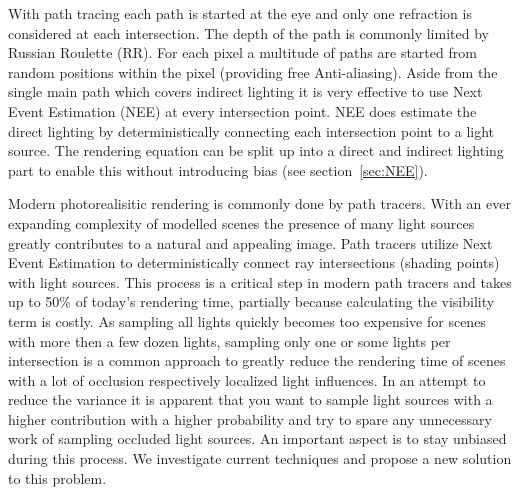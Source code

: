 With path tracing each path is started at the eye and only one refraction is considered at each intersection. The depth of the path is commonly limited by Russian Roulette (RR). For each pixel a multitude of paths are started from random positions within the pixel (providing free Anti-aliasing). Aside from the single main path which covers indirect lighting it is very effective to use Next Event Estimation (NEE) at every intersection point. NEE does estimate the direct lighting by deterministically connecting each intersection point to a light source. The rendering equation can be split up into a direct and indirect lighting part to enable this without introducing bias (see section~\ref{sec:NEE}).

Modern photorealisitic rendering is commonly done by path tracers. With an ever expanding complexity of modelled scenes the presence of many light sources greatly contributes to a natural and appealing image. Path tracers utilize Next Event Estimation to deterministically connect ray intersections (shading points) with light sources. This process is a critical step in modern path tracers and takes up to 50\% of today's rendering time, partially because calculating the visibility term is costly. As sampling all lights quickly becomes too expensive for scenes with more then a few dozen lights, sampling only one or some lights per intersection is a common approach to greatly reduce the rendering time of scenes with a lot of occlusion respectively localized light influences. In an attempt to reduce the variance it is apparent that you want to sample light sources with a higher contribution with a higher probability and try to spare any unnecessary work of sampling occluded light sources. An important aspect is to stay unbiased during this process. We investigate current techniques and propose a new solution to this problem.